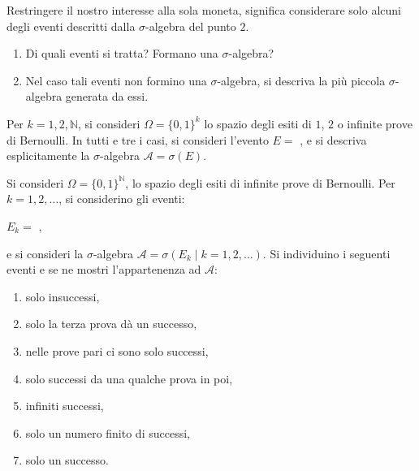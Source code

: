 Restringere il nostro interesse alla sola moneta, significa considerare solo alcuni degli eventi descritti dalla $\sigma $-algebra del punto $2$.
\begin{enumerate}[resume]
	\item Di quali eventi si tratta? Formano una $\sigma $-algebra?
	\item Nel caso tali eventi non formino una $\sigma $-algebra, si descriva la più piccola $\sigma $-algebra generata da essi.
\end{enumerate}

\Esercizio{}

Per $k=1,2,\mathbb{N}$, si consideri $\Omega =\{0,1\}^{k}$ lo spazio degli esiti di $1$, $2$ o infinite prove di Bernoulli. In tutti e tre i casi, si consideri l'evento $E=$ , e si descriva esplicitamente la $\sigma$-algebra $\mathcal{A} =\sigma ( E)$.

\Esercizio{}

Si consideri $\Omega =\{0,1\}^{\mathbb{N}}$, lo spazio degli esiti di infinite prove di Bernoulli. Per $k=1,2,\dots $, si considerino gli eventi:
\begin{center}
	$E_{k}=$ ,
\end{center}
e si consideri la $\sigma $-algebra $\mathcal{A} =\sigma ( E_{k} \mid k=1,2,\dots )$. Si individuino i seguenti eventi e se ne mostri l'appartenenza ad $\mathcal{A}$:
\begin{enumerate}
	\item solo insuccessi,
	\item solo la terza prova dà un successo,
	\item nelle prove pari ci sono solo successi,
	\item solo successi da una qualche prova in poi,
	\item infiniti successi,
	\item solo un numero finito di successi,
	\item solo un successo.
\end{enumerate}

\Esercizio{}

